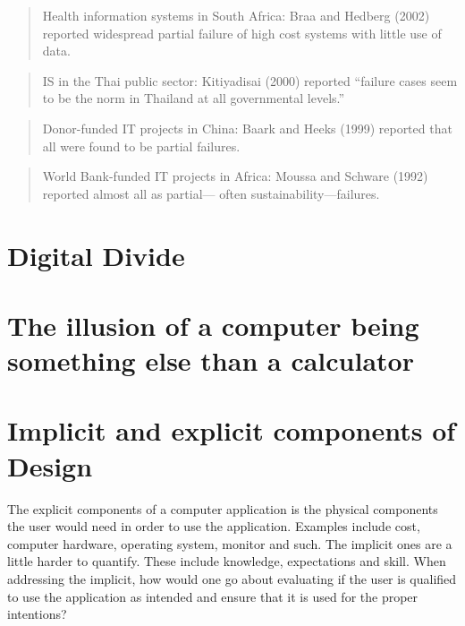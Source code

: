 \begin{quotation}
Health information systems in South Africa: Braa
and Hedberg (2002) reported widespread partial
failure of high cost systems with little use of data.\cite{rh:isdc}
\end{quotation}

\begin{quotation}
IS in the Thai public sector: Kitiyadisai (2000)
reported “failure cases seem to be the norm in
Thailand at all governmental levels.”\cite{rh:isdc}
\end{quotation}

\begin{quotation}
Donor-funded IT projects in China: Baark and
Heeks (1999) reported that all were found to be
partial failures.\cite{rh:isdc}
\end{quotation}

\begin{quotation}
World Bank-funded IT projects in Africa: Moussa
and Schware (1992) reported almost all as partial—
often sustainability—failures.\cite{rh:isdc}
\end{quotation}


\section{Digital Divide}

\section{The illusion of a computer being something else than a calculator}

\section{Implicit and explicit components of Design}
The explicit components of a computer application is the physical components the user would need in order to use the application.
Examples include cost, computer hardware, operating system, monitor and such.
The implicit ones are a little harder to quantify. These include knowledge, expectations and skill.
When addressing the implicit, how would one go about evaluating if the user is qualified to use the application as intended and ensure that it is used for the proper intentions?  

